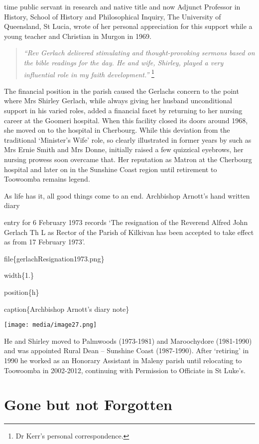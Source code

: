 time public servant in research and native title and now Adjunct
Professor in History, School of History and Philosophical Inquiry, The
University of Queensland, St Lucia, wrote of her personal appreciation
for this support while a young teacher and Christian in Murgon in 1969.

\begin{quote}
\emph{``Rev Gerlach delivered stimulating and thought-provoking sermons
based on the bible readings for the day. He and wife, Shirley, played a
very influential role in my faith development.''} \footnote{Dr Kerr's
  personal correspondence.}
\end{quote}

The financial position in the parish caused the Gerlachs concern to the
point where Mrs Shirley Gerlach, while always giving her husband
unconditional support in his varied roles, added a financial facet by
returning to her nursing career at the Goomeri hospital. When this
facility closed its doors around 1968, she moved on to the hospital in
Cherbourg. While this deviation from the traditional `Minister's Wife'
role, so clearly illustrated in former years by such as Mrs Ernie Smith
and Mrs Donne, initially raised a few quizzical eyebrows, her nursing
prowess soon overcame that. Her reputation as Matron at the Cherbourg
hospital and later on in the Sunshine Coast region until retirement to
Toowoomba remains legend.

As life has it, all good things come to an end. Archbishop Arnott's hand
written diary

entry for 6 February 1973 records `The resignation of the Reverend
Alfred John Gerlach Th L as Rector of the Parish of Kilkivan has been
accepted to take effect as from 17 February 1973'.

file\{gerlachResignation1973.png\}

width\{1.\}

position\{h\}

caption\{Archbishop Arnott's diary note\}

\texttt{[image: media/image27.png]}

He and Shirley moved to Palmwoods (1973-1981) and Maroochydore
(1981-1990) and was appointed Rural Dean -- Sunshine Coast (1987-1990).
After `retiring' in 1990 he worked as an Honorary Assistant in Maleny
parish until relocating to Toowoomba in 2002-2012, continuing with
Permission to Officiate in St Luke's.

\hypertarget{gone-but-not-forgotten}{%
\section{Gone but not Forgotten}\label{gone-but-not-forgotten}}

